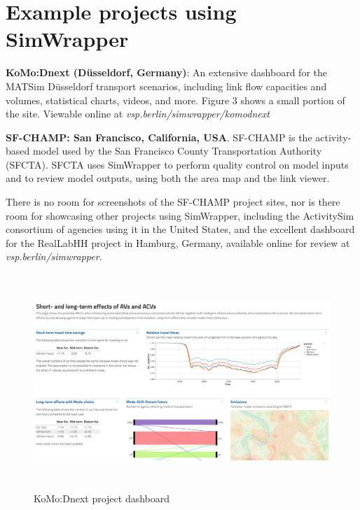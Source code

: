 \documentclass[3p,times,procedia]{elsarticle}
\begin{document}
\section{Example projects using SimWrapper}

\textbf{KoMo:Dnext (Düsseldorf, Germany)}: An extensive dashboard for the MATSim Düsseldorf transport scenarios, including link flow capacities and volumes, statistical charts, videos, and more. Figure 3 shows a small portion of the site. Viewable online at \textit{vsp.berlin/simwrapper/komodnext}

\textbf{SF-CHAMP: San Francisco, California, USA}. SF-CHAMP is the activity-based model used by the San Francisco County Transportation Authority (SFCTA)\cite{outwater2006san}. SFCTA uses SimWrapper to perform quality control on model inputs and to review model outputs, using both the area map and the link viewer.

There is no room for screenshots of the SF-CHAMP project sites, nor is there room for showcasing other projects using SimWrapper, including the ActivitySim consortium of agencies using it in the United States, and the excellent dashboard for the RealLabHH project in Hamburg, Germany, available online for review at \textit{vsp.berlin/simwrapper}.

\begin{figure}
  \centering
  \includegraphics[width=\textwidth,height=3.2in]{images/fig-komod-next.png.pdf}
  \caption{KoMo:Dnext project dashboard}
  \label{fig:chart3}
\end{figure}
\end{document}
